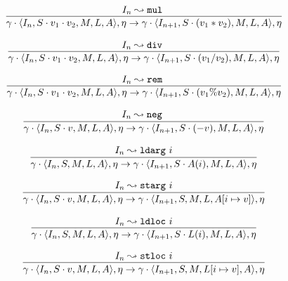 \documentclass[declaration,shortabstract,english,mgr]{iithesis}
\newcommand{\mstate}[5] {
	\langle#1, #2, #3, #4, #5\rangle
}
\newcommand{\ipointsto}[3] {
	#1 \leadsto \texttt{#2} \text{ } #3
}
\newcommand{\setarrayitem}[3] {
	#1[#2 \mapsto #3]
}
\begin{document}
\begin{equation}
\label{eq:semantics_mul}
	\infer{
		\gamma \cdot \mstate{I_n}{S \cdot v_1 \cdot v_2}{M}{L}{A}, \eta
			\rightarrow
		\gamma \cdot \mstate{I_{n+1}}{S \cdot (v_1 * v_2)}{M}{L}{A}, \eta		
	}
	{\ipointsto{I_n}{mul}}
\end{equation}

\begin{equation}
\label{eq:semantics_div}
	\infer{
		\gamma \cdot \mstate{I_n}{S \cdot v_1 \cdot v_2}{M}{L}{A}, \eta
			\rightarrow
		\gamma \cdot \mstate{I_{n+1}}{S \cdot (v_1 / v_2)}{M}{L}{A}, \eta		
	}
	{\ipointsto{I_n}{div}}
\end{equation}

\begin{equation}
\label{eq:semantics_rem}
	\infer{
		\gamma \cdot \mstate{I_n}{S \cdot v_1 \cdot v_2}{M}{L}{A}, \eta
			\rightarrow
		\gamma \cdot \mstate{I_{n+1}}{S \cdot (v_1 \% v_2)}{M}{L}{A}, \eta		
	}
	{\ipointsto{I_n}{rem}}
\end{equation}

\begin{equation}
\label{eq:semantics_neg}
	\infer{
		\gamma \cdot \mstate{I_n}{S \cdot v}{M}{L}{A}, \eta
			\rightarrow
		\gamma \cdot \mstate{I_{n+1}}{S \cdot (-v)}{M}{L}{A}, \eta		
	}
	{\ipointsto{I_n}{neg}}
\end{equation}

\begin{equation}
\label{eq:semantics_ldarg}
	\infer{
		\gamma \cdot \mstate{I_n}{S}{M}{L}{A}, \eta
			\rightarrow
		\gamma \cdot \mstate{I_{n+1}}{S \cdot A(i)}{M}{L}{A}, \eta
	}
	{\ipointsto{I_n}{ldarg}{i}}
\end{equation}

\begin{equation}
\label{eq:semantics_starg}
	\infer{
		\gamma \cdot \mstate{I_n}{S \cdot v}{M}{L}{A}, \eta
			\rightarrow
		\gamma \cdot \mstate{I_{n+1}}{S}{M}{L}{\setarrayitem{A}{i}{v}}, \eta
	}
	{\ipointsto{I_n}{starg}{i}}
\end{equation}

\begin{equation}
\label{eq:semantics_ldloc}
	\infer{
		\gamma \cdot \mstate{I_n}{S}{M}{L}{A}, \eta
			\rightarrow
		\gamma \cdot \mstate{I_{n+1}}{S \cdot L(i)}{M}{L}{A}, \eta
	}
	{\ipointsto{I_n}{ldloc}{i}}
\end{equation}

\begin{equation}
\label{eq:semantics_stloc}
	\infer{
		\gamma \cdot \mstate{I_n}{S \cdot v}{M}{L}{A}, \eta
			\rightarrow
		\gamma \cdot \mstate{I_{n+1}}{S}{M}{\setarrayitem{L}{i}{v}}{A}, \eta
	}
	{\ipointsto{I_n}{stloc}{i}}
\end{equation}
\end{document}
